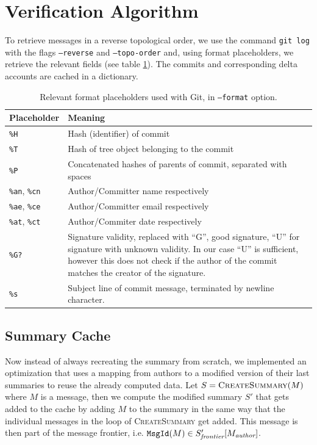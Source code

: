 \section{Verification Algorithm}
\label{sec:impl-verification-alg}
To retrieve messages in a reverse topological order, we use the command \texttt{git log} with the flags \texttt{--reverse} and \texttt{--topo-order} and, using format placeholders, we retrieve the relevant fields (see table \ref{tab:git-format-placeholders}). The commits and corresponding delta accounts are cached in a dictionary.

\begin{table}[ht]
    \centering
    \begin{tabular}{|l|p{8cm}|}
        \hline
        \textbf{Placeholder} & \textbf{Meaning} \\ \hline
        \texttt{\%H} & Hash (identifier) of commit\\ \hline
        \texttt{\%T} & Hash of tree object belonging to the commit\\ \hline
        \texttt{\%P} & Concatenated hashes of parents of commit, separated with spaces\\ \hline
        \texttt{\%an}, \texttt{\%cn} & Author/Committer name respectively\\ \hline
        \texttt{\%ae}, \texttt{\%ce} & Author/Committer email respectively\\ \hline
        \texttt{\%at}, \texttt{\%ct} & Author/Commiter date respectively\\ \hline
        \texttt{\%G?} & Signature validity, replaced with ``G'',  good signature, ``U'' for signature with unknown validity. In our case ``U'' is sufficient, however this does not check if the author of the commit matches the creator of the signature.\\ \hline
        \texttt{\%s} & Subject line of commit message, terminated by newline character.\\ \hline
    \end{tabular}
    \caption{Relevant format placeholders used with Git, in \texttt{--format} option.}
    \label{tab:git-format-placeholders}
\end{table}

\subsection{Summary Cache}
\label{sec:summary-cache}

Now instead of always recreating the summary from scratch, we implemented an optimization that uses a mapping from authors to a modified version of their last summaries to reuse the already computed data. Let $S = \textsc{CreateSummary}(M)$ where $M$ is a message, then we compute the modified summary $S'$ that gets added to the cache by adding $M$ to the summary in the same way that the individual messages in the loop of \textsc{CreateSummary} get added. This message is then part of the message frontier, i.e. $\texttt{MsgId}(M) \in S'_\emph{frontier}[M_\emph{author}]$.


